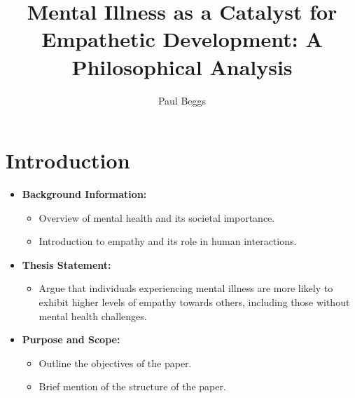 \documentclass[stu]{apa7}
\title{Mental Illness as a Catalyst for Empathetic Development: A Philosophical Analysis}
\author{Paul Beggs}
\begin{document}
\maketitle

\section{Introduction}
\begin{itemize}
    \item \textbf{Background Information:}
        \begin{itemize}
            \item Overview of mental health and its societal importance.
            \item Introduction to empathy and its role in human interactions.
        \end{itemize}
    \item \textbf{Thesis Statement:}
        \begin{itemize}
            \item Argue that individuals experiencing mental illness are more likely to exhibit higher levels of empathy towards others, including those without mental health challenges.
        \end{itemize}
    \item \textbf{Purpose and Scope:}
        \begin{itemize}
            \item Outline the objectives of the paper.
            \item Brief mention of the structure of the paper.
        \end{itemize}
\end{itemize}
\end{document}
